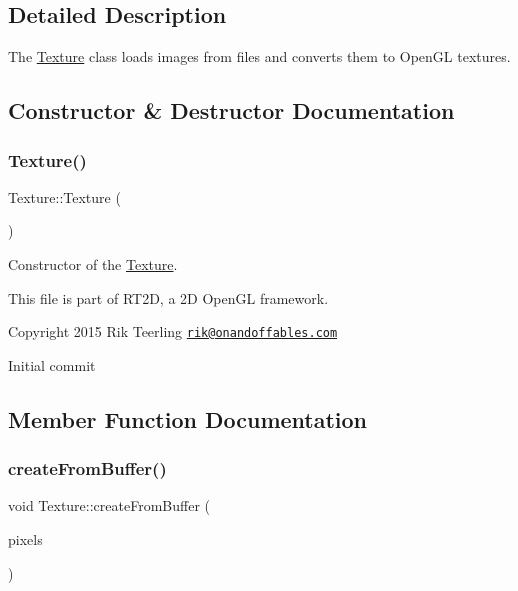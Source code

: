 \subsection{Detailed Description}
The \hyperlink{class_texture}{Texture} class loads images from files and converts them to Open\+GL textures. 

\subsection{Constructor \& Destructor Documentation}
\mbox{\label{class_texture_a6c275e3f186675ff6ed73ccf970e552f}} 
\subsubsection{\texorpdfstring{Texture()}{Texture()}}
{\footnotesize\ttfamily Texture\+::\+Texture (\begin{DoxyParamCaption}{ }\end{DoxyParamCaption})}



Constructor of the \hyperlink{class_texture}{Texture}. 

This file is part of R\+T2D, a 2D Open\+GL framework.


\begin{DoxyItemize}
\item Copyright 2015 Rik Teerling \href{mailto:rik@onandoffables.com}{\tt rik@onandoffables.\+com}
\begin{DoxyItemize}
\item Initial commit 
\end{DoxyItemize}
\end{DoxyItemize}

\subsection{Member Function Documentation}
\mbox{\label{class_texture_a2766d07d7c01aad338b457ae9d844e71}} 
\subsubsection{\texorpdfstring{create\+From\+Buffer()}{createFromBuffer()}}
{\footnotesize\ttfamily void Texture\+::create\+From\+Buffer (\begin{DoxyParamCaption}\item[{\hyperlink{struct_pixel_buffer}{Pixel\+Buffer} $\ast$}]{pixels }\end{DoxyParamCaption})}



